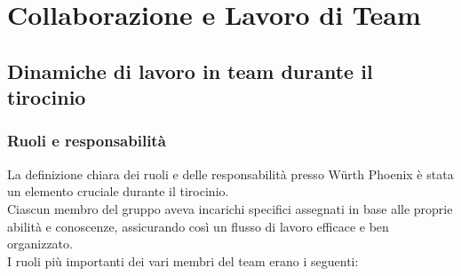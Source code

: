 \chapter{Collaborazione e Lavoro di Team}
\label{cha:team}

\section{Dinamiche di lavoro in team durante il tirocinio}
\label{sec:introduzione_team}

\subsection{Ruoli e responsabilità}
\label{sub:ruoli}

La definizione chiara dei ruoli e delle responsabilità presso Würth Phoenix è
stata un elemento cruciale durante il tirocinio.\\ Ciascun membro del gruppo
aveva incarichi specifici assegnati in base alle proprie abilità e conoscenze, assicurando
così un flusso di lavoro efficace e ben organizzato.\\ I ruoli più importanti dei
vari membri del team erano i seguenti:
